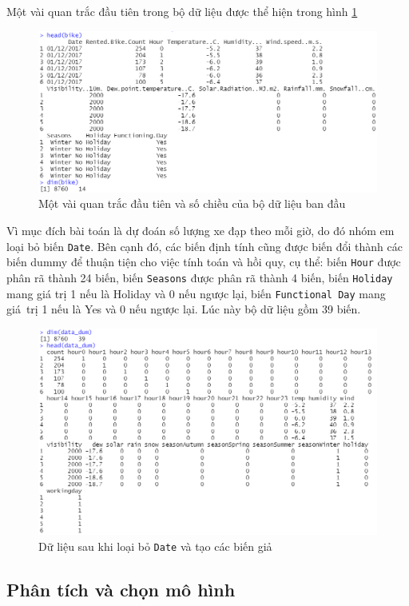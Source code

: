 Một vài quan trắc đầu tiên trong bộ dữ liệu được thể hiện trong hình \ref{A2_head}

\begin{figure}[H]
	\centering
	\includegraphics[width=0.7\linewidth]{../Photo Of Result/A2_head}
	\caption{Một vài quan trắc đầu tiên và số chiều của bộ dữ liệu ban đầu}
	\label{A2_head}
\end{figure}

Vì mục đích bài toán là dự đoán số lượng xe đạp theo mỗi giờ, do đó nhóm em loại bỏ biến \texttt{Date}. Bên cạnh đó, các biến định tính cũng được biến đổi thành các biến dummy để thuận tiện cho việc tính toán và hồi quy, cụ thể: biến \texttt{Hour} được phân rã thành 24 biến, biến \texttt{Seasons} được phân rã thành 4 biến, biến \texttt{Holiday} mang giá trị 1 nếu là Holiday và 0 nếu ngược lại, biến \texttt{Functional Day} mang giá~trị 1 nếu là Yes và 0 nếu ngược lại. Lúc này bộ dữ liệu gồm 39 biến.
\begin{figure}[H]
	\centering
	\includegraphics[width=0.7\linewidth]{../Photo Of Result/A2_dummy}
	\caption{Dữ liệu sau khi loại bỏ \texttt{Date} và tạo các biến giả}
	\label{A2_head2}
\end{figure}

\subsection*{Phân tích và chọn mô hình}

